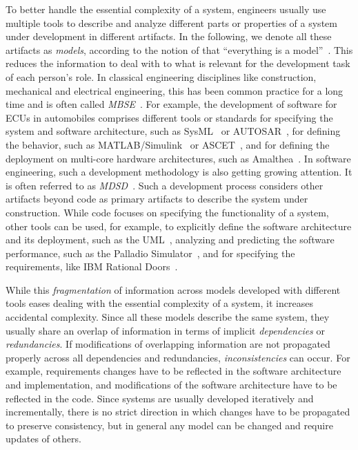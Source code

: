 To better handle the essential complexity of a system, engineers usually use multiple tools to describe and analyze different parts or properties of a system under development in different artifacts.
In the following, we denote all these artifacts as \emph{models}, according to the notion of \citeauthor{bezivin2005sosym} that \enquote{everything is a model}~\cite{bezivin2005sosym}.
This reduces the information to deal with to what is relevant for the development task of each person's role.
In classical engineering disciplines like construction, mechanical and electrical engineering, this has been common practice for a long time and is often called \emph{\gls{MBSE}}~\cite{estefan2007MbseSurvey}.
For example, the development of software for \glspl{ECU} in automobiles comprises different tools or standards for specifying the system and software architecture, such as SysML~\cite{sysml} or AUTOSAR~\cite{scheid2015autosar}, for defining the behavior, such as MATLAB/Simulink~\cite{simulink} or ASCET~\cite{ascet}, and for defining the deployment on multi-core hardware architectures, such as Amalthea~\cite{amalthea, wolff2014a}.
In software engineering, such a development methodology is also getting growing attention.
It is often referred to as \emph{\gls{MDSD}}~\cite{stahl2006a}.
Such a development process considers other artifacts beyond code as primary artifacts to describe the system under construction.
While code focuses on specifying the functionality of a system, other tools can be used, for example, to explicitly define the software architecture and its deployment, such as the \gls{UML}~\cite{uml}, analyzing and predicting the software performance, such as the Palladio Simulator~\cite{reussner2016a}, and for specifying the requirements, like IBM Rational Doors~\cite{laplante2012RequirementsEngineering-Book}.

While this \emph{fragmentation} of information across models developed with different tools eases dealing with the essential complexity of a system, it increases accidental complexity.
Since all these models describe the same system, they usually share an overlap of information in terms of implicit \emph{dependencies} or \emph{redundancies}.
If modifications of overlapping information are not propagated properly across all dependencies and redundancies, \emph{inconsistencies} can occur.
For example, requirements changes have to be reflected in the software architecture and implementation, and modifications of the software architecture have to be reflected in the code.
Since systems are usually developed iteratively and incrementally, there is no strict direction in which changes have to be propagated to preserve consistency, but in general any model can be changed and require updates of others.

